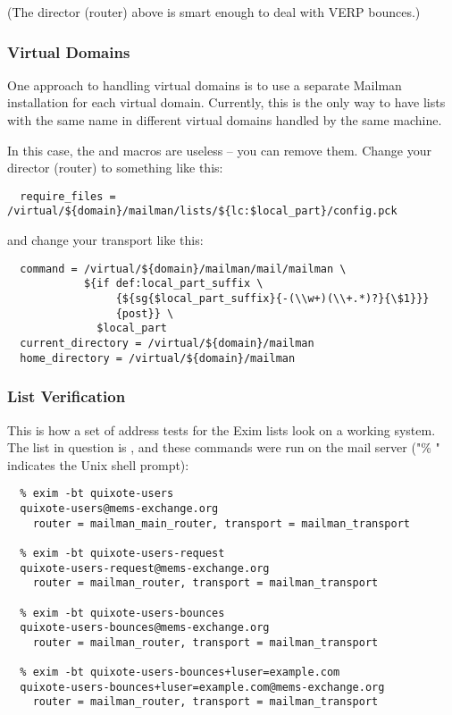 \documentclass{howto}
\begin{document}
(The director (router) above is smart enough to deal with VERP bounces.)

\subsubsection{Virtual Domains}

One approach to handling virtual domains is to use a separate Mailman
installation for each virtual domain.  Currently, this is the only way to have
lists with the same name in different virtual domains handled by the same
machine.

In this case, the  and  macros are useless
-- you can remove them.  Change your director (router) to something like this:

\begin{verbatim}
  require_files = /virtual/${domain}/mailman/lists/${lc:$local_part}/config.pck
\end{verbatim}

and change your transport like this:

\begin{verbatim}
  command = /virtual/${domain}/mailman/mail/mailman \
            ${if def:local_part_suffix \
                 {${sg{$local_part_suffix}{-(\\w+)(\\+.*)?}{\$1}}}
                 {post}} \
              $local_part
  current_directory = /virtual/${domain}/mailman
  home_directory = /virtual/${domain}/mailman
\end{verbatim}

\subsubsection{List Verification}

This is how a set of address tests for the Exim lists look on a working
system.  The list in question is , and
these commands were run on the  mail server ("\% "
indicates the Unix shell prompt):

\begin{verbatim}
  % exim -bt quixote-users
  quixote-users@mems-exchange.org
    router = mailman_main_router, transport = mailman_transport

  % exim -bt quixote-users-request
  quixote-users-request@mems-exchange.org
    router = mailman_router, transport = mailman_transport

  % exim -bt quixote-users-bounces
  quixote-users-bounces@mems-exchange.org
    router = mailman_router, transport = mailman_transport

  % exim -bt quixote-users-bounces+luser=example.com
  quixote-users-bounces+luser=example.com@mems-exchange.org
    router = mailman_router, transport = mailman_transport
\end{verbatim}
\end{document}
